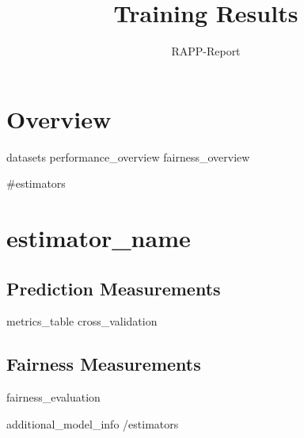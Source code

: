 \documentclass{hhuarticle}
\author{RAPP-Report}
\title{Training Results}
\begin{document}
\maketitle

\tableofcontents

\section{Overview}

{{{datasets}}}
{{{performance_overview}}}
{{{fairness_overview}}}

{{#estimators}}
\clearpage
\section{ {{estimator_name}} }

\subsection{Prediction Measurements}
{{{metrics_table}}}
{{{cross_validation}}}

\subsection{Fairness Measurements}
{{{fairness_evaluation}}}

{{{additional_model_info}}}
{{/estimators}}
\end{document}
